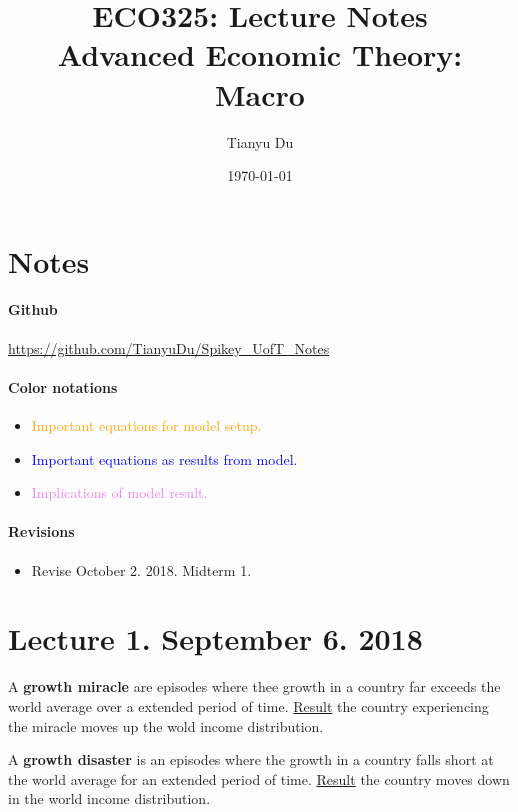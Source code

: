 \documentclass[]{article}
\title{ECO325: Lecture Notes \\ \small Advanced Economic Theory: Macro}
\author{Tianyu Du}
\date{\today}
\begin{document}
    \maketitle
    \doclicenseThis
    \section*{Notes}
    	\paragraph{Github} \url{https://github.com/TianyuDu/Spikey_UofT_Notes}
    	\paragraph{Color notations}
    		\begin{itemize}
    			\item \textcolor{orange}{Important equations for model setup.}
    			\item \textcolor{blue}{Important equations as results from model.}
    			\item \textcolor{violet}{Implications of model result.}
    		\end{itemize}
    \paragraph{Revisions}
    \begin{itemize}
    	\item Revise October 2. 2018. Midterm 1.
    \end{itemize}
    \tableofcontents
    \newpage
    
    \section{Lecture 1. September 6. 2018}
        \begin{definition}
            A \textbf{growth miracle} are episodes where thee growth in a country far exceeds the world average over a extended period of time. \ul{Result} the country experiencing the miracle moves up the wold income distribution.
        \end{definition}
        
        \begin{definition}
            A \textbf{growth disaster} is an episodes where the growth in a country falls short at the world average for an extended period of time. \ul{Result} the country moves down in the world income distribution.
        \end{definition}
    
\end{document}
